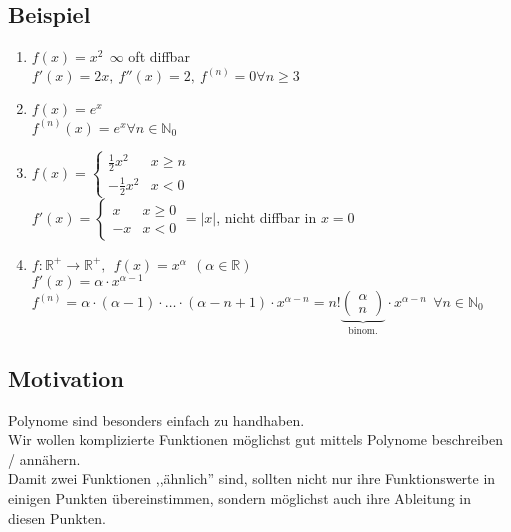 \subsection{Beispiel}
\begin{enumerate}
	\item
	$f(x)=x^2 \ \ \infty$ oft diffbar\\
	$f'(x)=2x, \ f''(x)=2, \ f^{(n)}=0 \forall n\ge 3$
	
	\item
	$f(x)=e^x$\\
	$f^{(n)}(x)=e^x \forall n\in\mathbb{N}_0$
	
	\item
	$f(x)=\left\lbrace\begin{array}{ll}
	\frac{1}{2}x^2 & x\ge n\\
	-\frac{1}{2}x^2 & x< 0
	\end{array}\right.$\\
	$f'(x)=\left\lbrace\begin{array}{ll}
	x & x\ge 0\\
	-x & x<0
	\end{array}\right. = |x|$, nicht diffbar in $x=0$
	
	\item
	$f:\mathbb{R}^+\rightarrow\mathbb{R}^+, \ \ f(x)=x^\alpha \ \ (\alpha\in\mathbb{R})$\\
	$f'(x)=\alpha\cdot x^{\alpha-1}$\\
	$f^{(n)}=\alpha\cdot (\alpha-1)\cdot \dots\cdot (\alpha-n+1)\cdot x^{\alpha-n} = n!\underbrace{\begin{pmatrix}\alpha \\ n\end{pmatrix}}_{\text{binom.}}\cdot x^{\alpha-n} \ \ \forall n\in\mathbb{N}_0$
\end{enumerate}

\subsection{Motivation}
Polynome sind besonders einfach zu handhaben.\\
Wir wollen komplizierte Funktionen möglichst gut mittels Polynome beschreiben / annähern.\\
Damit zwei Funktionen ,,ähnlich'' sind, sollten nicht nur ihre Funktionswerte in einigen Punkten übereinstimmen, sondern möglichst auch ihre Ableitung in diesen Punkten.


